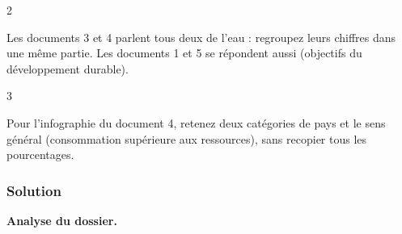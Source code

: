 \documentclass[11pt,a4paper]{article}
\begin{document}
\begin{indication}{2}

Les documents 3 et 4 parlent tous deux de l'eau : regroupez leurs chiffres dans une même partie. Les documents 1 et 5 se répondent aussi (objectifs du développement durable).

\end{indication}

\begin{indication}{3}

Pour l'infographie du document 4, retenez deux catégories de pays et le sens général (consommation supérieure aux ressources), sans recopier tous les pourcentages.

\end{indication}

\hypertarget{solution-2}{%
\subsubsection{Solution}\label{solution-2}}

\textbf{Analyse du dossier.}
\end{document}
